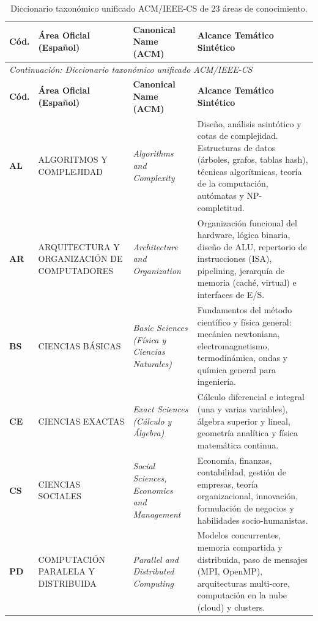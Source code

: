 \documentclass[11pt,a4paper]{article}
\begin{document}
\begin{small}
\setlength{\tabcolsep}{4pt}
\begin{longtable}{p{0.9cm} >{\raggedright\arraybackslash}p{4.4cm} >{\raggedright\arraybackslash}p{4.0cm} >{\raggedright\arraybackslash}p{5.4cm}}
\caption{Diccionario taxonómico unificado ACM/IEEE-CS de 23 áreas de conocimiento.} \label{tab:diccionario_23} \\
\toprule
\textbf{Cód.} & \textbf{Área Oficial (Español)} & \textbf{Canonical Name (ACM)} & \textbf{Alcance Temático Sintético} \\
\midrule
\endfirsthead
\multicolumn{4}{l}{\small\textit{Continuación: Diccionario taxonómico unificado ACM/IEEE-CS}} \\[3pt]
\toprule
\textbf{Cód.} & \textbf{Área Oficial (Español)} & \textbf{Canonical Name (ACM)} & \textbf{Alcance Temático Sintético} \\
\midrule
\endhead
\bottomrule
\endfoot
\textbf{AL} & ALGORITMOS Y COMPLEJIDAD & \textit{Algorithms and Complexity} & Diseño, análisis asintótico y cotas de complejidad. Estructuras de datos (árboles, grafos, tablas hash), técnicas algorítmicas, teoría de la computación, autómatas y NP-completitud. \\
\textbf{AR} & ARQUITECTURA Y ORGANIZACIÓN DE COMPUTADORES & \textit{Architecture and Organization} & Organización funcional del hardware, lógica binaria, diseño de ALU, repertorio de instrucciones (ISA), pipelining, jerarquía de memoria (caché, virtual) e interfaces de E/S. \\
\textbf{BS} & CIENCIAS BÁSICAS & \textit{Basic Sciences (Física y Ciencias Naturales)} & Fundamentos del método científico y física general: mecánica newtoniana, electromagnetismo, termodinámica, ondas y química general para ingeniería. \\
\textbf{CE} & CIENCIAS EXACTAS & \textit{Exact Sciences (Cálculo y Álgebra)} & Cálculo diferencial e integral (una y varias variables), álgebra superior y lineal, geometría analítica y física matemática continua. \\
\textbf{CS} & CIENCIAS SOCIALES & \textit{Social Sciences, Economics and Management} & Economía, finanzas, contabilidad, gestión de empresas, teoría organizacional, innovación, formulación de negocios y habilidades socio-humanistas. \\
\textbf{PD} & COMPUTACIÓN PARALELA Y DISTRIBUIDA & \textit{Parallel and Distributed Computing} & Modelos concurrentes, memoria compartida y distribuida, paso de mensajes (MPI, OpenMP), arquitecturas multi-core, computación en la nube (cloud) y clusters. \\

\end{longtable}
\end{small}
\end{document}
